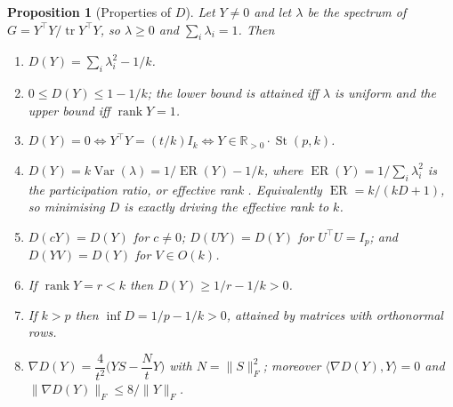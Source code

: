 \documentclass[11pt]{article}
\newtheorem{proposition}{Proposition}
\theoremstyle{definition}
\DeclareMathOperator{\tr}{tr}
\DeclareMathOperator{\Var}{Var}
\DeclareMathOperator{\st}{St}
\DeclareMathOperator{\ER}{ER}
\newcommand{\R}{\mathbb{R}}
\newcommand{\Rpos}{\R_{>0}}
\newcommand{\Fnorm}[1]{\lVert #1 \rVert_F}
\newcommand{\ip}[2]{\langle #1, #2 \rangle}
\begin{document}
\begin{proposition}[Properties of $D$]\label{prop:D}
Let $Y \ne 0$ and let $\lambda$ be the spectrum of $G = Y^\top Y/\tr Y^\top Y$,
so $\lambda \ge 0$ and $\sum_i \lambda_i = 1$. Then
\begin{enumerate}\itemsep1pt
\item[(i)] $D(Y) = \sum_i \lambda_i^2 - 1/k$.
\item[(ii)] $0 \le D(Y) \le 1 - 1/k$; the lower bound is attained iff $\lambda$
  is uniform and the upper bound iff $\operatorname{rank}Y = 1$.
\item[(iii)] $D(Y) = 0 \iff Y^\top Y = (t/k) I_k \iff Y \in \Rpos\cdot\st(p,k)$.
\item[(iv)] $D(Y) = k\Var(\lambda) = 1/\ER(Y) - 1/k$, where
  $\ER(Y) = 1/\sum_i\lambda_i^2$ is the participation ratio, or effective rank
  \citep{roy2007}. Equivalently $\ER = k/(kD+1)$, so minimising $D$ is exactly
  driving the effective rank to $k$.
\item[(v)] $D(cY) = D(Y)$ for $c \ne 0$; $D(UY) = D(Y)$ for $U^\top U = I_p$;
  and $D(YV) = D(Y)$ for $V \in O(k)$.
\item[(vi)] If $\operatorname{rank} Y = r < k$ then $D(Y) \ge 1/r - 1/k > 0$.
\item[(vii)] If $k > p$ then $\inf D = 1/p - 1/k > 0$, attained by matrices with
  orthonormal rows.
\item[(viii)] $\nabla D(Y) = \dfrac{4}{t^2}\Big(YS - \dfrac{N}{t}Y\Big)$ with
  $N = \Fnorm{S}^2$; moreover $\ip{\nabla D(Y)}{Y} = 0$ and
  $\Fnorm{\nabla D(Y)} \le 8/\Fnorm{Y}$.
\end{enumerate}
\end{proposition}
\end{document}
